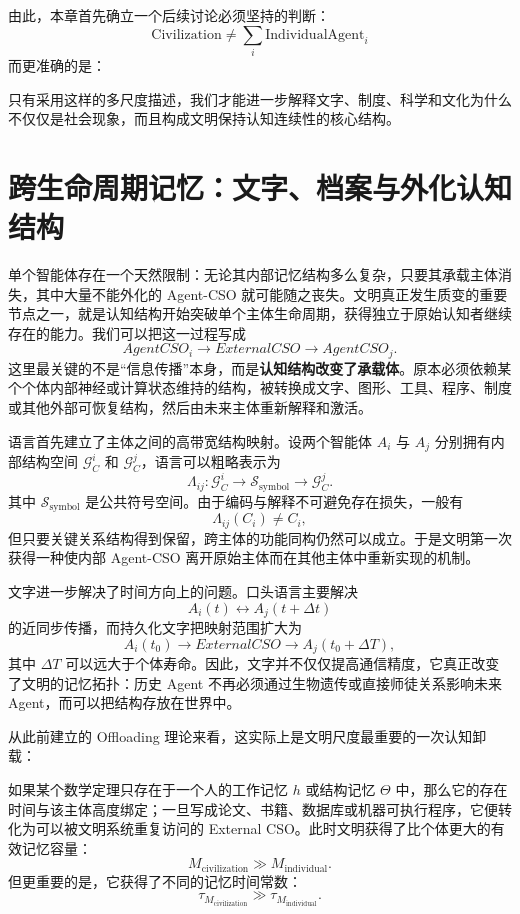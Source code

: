 由此，本章首先确立一个后续讨论必须坚持的判断：
\[
\boxed{
\text{Civilization}
\neq
\sum_i \text{IndividualAgent}_i
}
\]
而更准确的是：
\begin{statementbox}
\centering
{}
\end{statementbox}
只有采用这样的多尺度描述，我们才能进一步解释文字、制度、科学和文化为什么不仅仅是社会现象，而且构成文明保持认知连续性的核心结构。

\section{跨生命周期记忆：文字、档案与外化认知结构}

单个智能体存在一个天然限制：无论其内部记忆结构多么复杂，只要其承载主体消失，其中大量不能外化的 Agent-CSO 就可能随之丧失。文明真正发生质变的重要节点之一，就是认知结构开始突破单个主体生命周期，获得独立于原始认知者继续存在的能力。我们可以把这一过程写成
\[
AgentCSO_i
\rightarrow
ExternalCSO
\rightarrow
AgentCSO_j.
\]
这里最关键的不是“信息传播”本身，而是\textbf{认知结构改变了承载体}。原本必须依赖某个个体内部神经或计算状态维持的结构，被转换成文字、图形、工具、程序、制度或其他外部可恢复结构，然后由未来主体重新解释和激活。

语言首先建立了主体之间的高带宽结构映射。设两个智能体 $A_i$ 与 $A_j$ 分别拥有内部结构空间 $\mathcal G_C^i$ 和 $\mathcal G_C^j$，语言可以粗略表示为
\[
\Lambda_{ij}:
\mathcal G_C^i
\rightarrow
\mathcal S_{\mathrm{symbol}}
\rightarrow
\mathcal G_C^j.
\]
其中 $\mathcal S_{\mathrm{symbol}}$ 是公共符号空间。由于编码与解释不可避免存在损失，一般有
\[
\Lambda_{ij}(C_i)\neq C_i,
\]
但只要关键关系结构得到保留，跨主体的功能同构仍然可以成立。于是文明第一次获得一种使内部 Agent-CSO 离开原始主体而在其他主体中重新实现的机制。

文字进一步解决了时间方向上的问题。口头语言主要解决
\[
A_i(t)
\leftrightarrow
A_j(t+\Delta t)
\]
的近同步传播，而持久化文字把映射范围扩大为
\[
A_i(t_0)
\rightarrow
ExternalCSO
\rightarrow
A_j(t_0+\Delta T),
\]
其中 $\Delta T$ 可以远大于个体寿命。因此，文字并不仅仅提高通信精度，它真正改变了文明的记忆拓扑：历史 Agent 不再必须通过生物遗传或直接师徒关系影响未来 Agent，而可以把结构存放在世界中。

从此前建立的 Offloading 理论来看，这实际上是文明尺度最重要的一次认知卸载：
\begin{statementbox}
\centering
{}
\end{statementbox}
如果某个数学定理只存在于一个人的工作记忆 $h$ 或结构记忆 $\Theta$ 中，那么它的存在时间与该主体高度绑定；一旦写成论文、书籍、数据库或机器可执行程序，它便转化为可以被文明系统重复访问的 External CSO。此时文明获得了比个体更大的有效记忆容量：
\[
M_{\mathrm{civilization}}
\gg
M_{\mathrm{individual}}.
\]
但更重要的是，它获得了不同的记忆时间常数：
\[
\tau_{M_{\mathrm{civilization}}}
\gg
\tau_{M_{\mathrm{individual}}}.
\]

